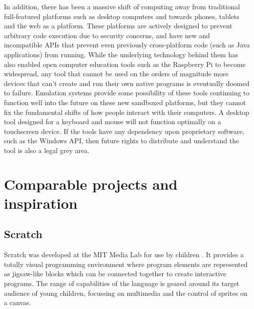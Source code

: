 In addition, there has been a massive shift of computing away from traditional full-featured platforms such as desktop computers and towards phones, tablets and the web as a platform. These platforms are actively designed to prevent arbitrary code execution due to security concerns, and have new and incompatible APIs that prevent even previously cross-platform code (such as Java applications) from running. While the underlying technology behind them has also enabled open computer education tools such as the Raspberry Pi to become widespread, any tool that cannot be used on the orders of magnitude more devices that can't create and run their own native programs is eventually doomed to failure. Emulation systems provide some possibility of these tools continuing to function well into the future on these new sandboxed platforms, but they cannot fix the fundamental shifts of how people interact with their computers. A desktop tool designed for a keyboard and mouse will not function optimally on a touchscreen device. If the tools have any dependency upon proprietary software, such as the Windows API, then future rights to distribute and understand the tool is also a legal grey area.

\section{Comparable projects and inspiration}

\subsection{Scratch}

Scratch was developed at the MIT Media Lab for use by children \cite{Resnick:2009:SP:1592761.1592779}. It provides a totally visual programming environment where program elements are represented as jigsaw-like blocks which can be connected together to create interactive programs. The range of capabilities of the language is geared around its target audience of young children, focussing on multimedia and the control of sprites on a canvas.

